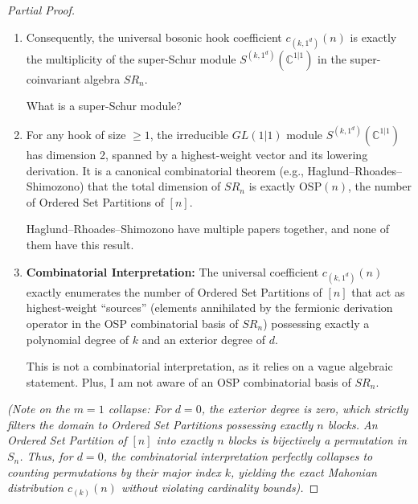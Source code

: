 \documentclass[12pt]{article}
\newcommand{\review}[1]{\begin{reviewbox}#1\end{reviewbox}}
\begin{document}
\begin{proof}[Partial Proof]
\begin{enumerate}
    \review{Again, it is unclear what it means to evaluate $R^{(m)}_n$ at $E$.}
    
    \item Consequently, the universal bosonic hook coefficient $c_{(k, 1^d)}(n)$ is exactly the multiplicity of the super-Schur module $S^{(k, 1^d)}(\mathbb{C}^{1|1})$ in the super-coinvariant algebra $SR_n$. 

    \review{What is a super-Schur module?}
    
    \item For any hook of size $\ge 1$, the irreducible $GL(1|1)$ module $S^{(k, 1^d)}(\mathbb{C}^{1|1})$ has dimension 2, spanned by a highest-weight vector and its lowering derivation. It is a canonical combinatorial theorem (e.g., Haglund--Rhoades--Shimozono) that the total dimension of $SR_n$ is exactly $\mathrm{OSP}(n)$, the number of Ordered Set Partitions of $[n]$.

    \review{Haglund--Rhoades--Shimozono have multiple papers together, and none of them have this result.}
    
    \item \textbf{Combinatorial Interpretation:} The universal coefficient $c_{(k, 1^d)}(n)$ exactly enumerates the number of Ordered Set Partitions of $[n]$ that act as highest-weight ``sources'' (elements annihilated by the fermionic derivation operator in the OSP combinatorial basis of $SR_n$) possessing exactly a polynomial degree of $k$ and an exterior degree of $d$. 

\review{This is not a combinatorial interpretation, as it relies on a vague algebraic statement. Plus, I am not aware of an OSP combinatorial basis of $SR_n$.}

\end{enumerate}

\emph{(Note on the $m=1$ collapse: For $d=0$, the exterior degree is zero, which strictly filters the domain to Ordered Set Partitions possessing exactly $n$ blocks. An Ordered Set Partition of $[n]$ into exactly $n$ blocks is bijectively a permutation in $S_n$. Thus, for $d=0$, the combinatorial interpretation perfectly collapses to counting permutations by their major index $k$, yielding the exact Mahonian distribution $c_{(k)}(n)$ without violating cardinality bounds).}
\end{proof}
\end{document}

